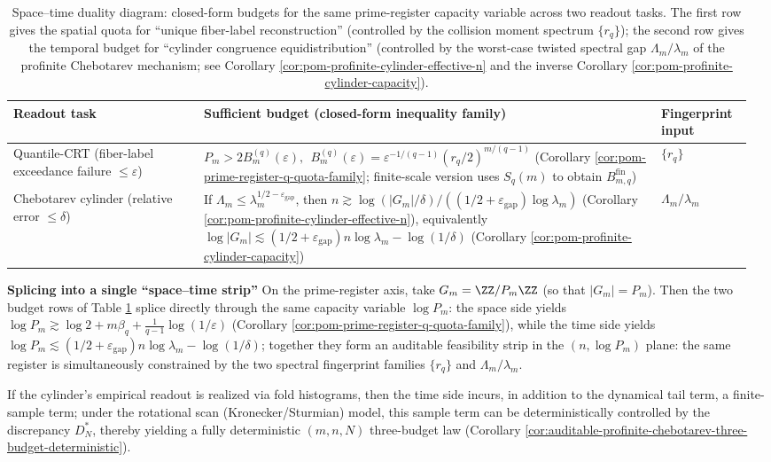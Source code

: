 \begin{table}[H]
\centering
\scriptsize
\setlength{\tabcolsep}{6pt}
\caption{Space--time duality diagram: closed-form budgets for the same prime-register capacity variable across two readout tasks. The first row gives the spatial quota for ``unique fiber-label reconstruction'' (controlled by the collision moment spectrum \(\{r_q\}\)); the second row gives the temporal budget for ``cylinder congruence equidistribution'' (controlled by the worst-case twisted spectral gap \(\Lambda_m/\lambda_m\) of the profinite Chebotarev mechanism; see Corollary \ref{cor:pom-profinite-cylinder-effective-n} and the inverse Corollary \ref{cor:pom-profinite-cylinder-capacity}).}
\label{tab:pom-space-time-duality-prime-register}
\begin{tabular}{p{0.25\linewidth} p{0.60\linewidth} p{0.12\linewidth}}
\toprule
Readout task & Sufficient budget (closed-form inequality family) & Fingerprint input\\
\midrule
Quantile-CRT (fiber-label exceedance failure \(\le\varepsilon\)) &
\(
P_m>2B_m^{(q)}(\varepsilon),
\ \
B_m^{(q)}(\varepsilon)=\varepsilon^{-1/(q-1)}(r_q/2)^{m/(q-1)}
\)
(Corollary \ref{cor:pom-prime-register-q-quota-family}; finite-scale version uses \(S_q(m)\) to obtain \(B_{m,q}^{\mathrm{fin}}\)) &
\(\{r_q\}\)\\

Chebotarev cylinder (relative error \(\le\delta\)) &
If \(\Lambda_m\le \lambda_m^{1/2-\varepsilon_{\mathrm{gap}}}\), then
\(
n\gtrsim \log(|G_m|/\delta)/((1/2+\varepsilon_{\mathrm{gap}})\log\lambda_m)
\)
(Corollary \ref{cor:pom-profinite-cylinder-effective-n}), equivalently
\(
\log|G_m|\lesssim (1/2+\varepsilon_{\mathrm{gap}})n\log\lambda_m-\log(1/\delta)
\)
(Corollary \ref{cor:pom-profinite-cylinder-capacity}) &
\(\Lambda_m/\lambda_m\)\\
\bottomrule
\end{tabular}
\end{table}

\noindent\textbf{Splicing into a single ``space--time strip''}
On the prime-register axis, take \(G_m=\ZZ/P_m\ZZ\) (so that \(|G_m|=P_m\)).
Then the two budget rows of Table \ref{tab:pom-space-time-duality-prime-register} splice directly through the same capacity variable \(\log P_m\): the space side yields
\(
\log P_m\gtrsim \log 2+m\beta_q+\frac{1}{q-1}\log(1/\varepsilon)
\)
(Corollary \ref{cor:pom-prime-register-q-quota-family}), while the time side yields
\(
\log P_m\lesssim (1/2+\varepsilon_{\mathrm{gap}})n\log\lambda_m-\log(1/\delta)
\);
together they form an auditable feasibility strip in the \((n,\log P_m)\) plane: the same register is simultaneously constrained by the two spectral fingerprint families \(\{r_q\}\) and \(\Lambda_m/\lambda_m\).
\par
If the cylinder's empirical readout is realized via fold histograms, then the time side incurs, in addition to the dynamical tail term, a finite-sample term; under the rotational scan (Kronecker/Sturmian) model, this sample term can be deterministically controlled by the discrepancy \(D_N^*\), thereby yielding a fully deterministic \((m,n,N)\) three-budget law (Corollary \ref{cor:auditable-profinite-chebotarev-three-budget-deterministic}).

